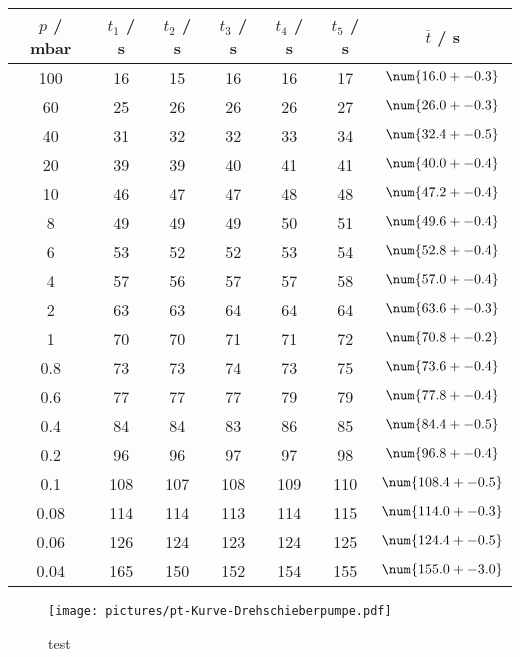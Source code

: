 \begin{table} %
  \centering
  \caption{}
  \label{}
  \begin{tabular}{c|c|c|c|c|c|c}
    $p$ / mbar & $t_1$ / s & $t_2$ / s & $t_3$ / s & $t_4$ / s & $t_5$ / s & $\overline{t}$ / s \\
    \hline
    100  & 16  & 15  & 16  & 16  & 17  & $\num{16.0 +- 0.3}$ \\
    60   & 25  & 26  & 26  & 26  & 27  & $\num{26.0 +- 0.3}$ \\
    40   & 31  & 32  & 32  & 33  & 34  & $\num{32.4 +- 0.5}$ \\
    \hline
    20   & 39  & 39  & 40  & 41  & 41  & $\num{40.0 +- 0.4}$ \\
    10   & 46  & 47  & 47  & 48  & 48  & $\num{47.2 +- 0.4}$ \\
    8    & 49  & 49  & 49  & 50  & 51  & $\num{49.6 +- 0.4}$ \\
    6    & 53  & 52  & 52  & 53  & 54  & $\num{52.8 +- 0.4}$ \\
    4    & 57  & 56  & 57  & 57  & 58  & $\num{57.0 +- 0.4}$ \\
    2    & 63  & 63  & 64  & 64  & 64  & $\num{63.6 +- 0.3}$ \\
    \hline
    1    & 70  & 70  & 71  & 71  & 72  & $\num{70.8 +- 0.2}$ \\
    0.8  & 73  & 73  & 74  & 73  & 75  & $\num{73.6 +- 0.4}$ \\
    0.6  & 77  & 77  & 77  & 79  & 79  & $\num{77.8 +- 0.4}$ \\
    0.4  & 84  & 84  & 83  & 86  & 85  & $\num{84.4 +- 0.5}$ \\
    0.2  & 96  & 96  & 97  & 97  & 98  & $\num{96.8 +- 0.4}$ \\
    \hline
    0.1  & 108 & 107 & 108 & 109 & 110 & $\num{108.4 +- 0.5}$ \\
    0.08 & 114 & 114 & 113 & 114 & 115 & $\num{114.0 +- 0.3}$ \\
    0.06 & 126 & 124 & 123 & 124 & 125 & $\num{124.4 +- 0.5}$ \\
    0.04 & 165 & 150 & 152 & 154 & 155 & $\num{155.0 +- 3.0}$ \\
  \end{tabular}
\end{table}

\begin{figure}[H] %
  \centering
  \texttt{[image: pictures/pt-Kurve-Drehschieberpumpe.pdf]}
  \caption{test}
  \label{fig:test}
\end{figure}


